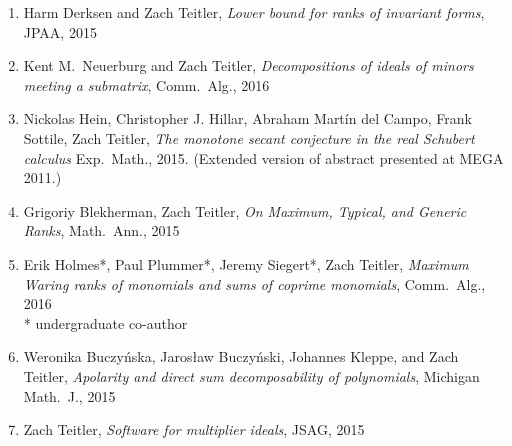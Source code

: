 \documentclass[12pt]{article}
\begin{document}
\begin{enumerate}[revarabic,leftmargin=*]
\item Harm Derksen and Zach Teitler,
\emph{Lower bound for ranks of invariant forms},
JPAA,
2015

\item Kent M.\ Neuerburg and Zach Teitler,
\emph{Decompositions of ideals of minors meeting a submatrix},
Comm.\ Alg.,
2016


\item Nickolas Hein, Christopher J. Hillar, Abraham Mart\'in del Campo, Frank Sottile, Zach Teitler,
\emph{The monotone secant conjecture in the real Schubert calculus}
Exp.\ Math.,
2015.
(Extended version of abstract presented at MEGA 2011.)

\item Grigoriy Blekherman, Zach Teitler,
\emph{On Maximum, Typical, and Generic Ranks},
Math.\ Ann.,
2015

\item Erik Holmes*, Paul Plummer*, Jeremy Siegert*, Zach Teitler,
\emph{Maximum Waring ranks of monomials and sums of coprime monomials},
Comm.\ Alg.,
2016\\
* undergraduate co-author

\item Weronika Buczy\'nska, Jaros{\l}aw Buczy\'nski, Johannes Kleppe, and Zach Teitler,
\emph{Apolarity and direct sum decomposability of polynomials},
Michigan Math.\ J.,
2015

\item Zach Teitler,
\emph{Software for multiplier ideals},
JSAG,
2015


\end{enumerate}
\end{document}

